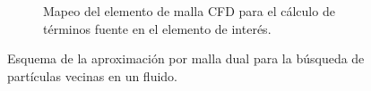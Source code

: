 \begin{figure}[h!]
\begin{subfigure}[b]{0.3\textwidth}
\begin{adjustbox}{max width = \textwidth}
		\end{adjustbox}
	\caption{Mapeo del elemento de malla CFD para el c\'alculo de t\'erminos fuente en el elemento de inter\'es.}
	\end{subfigure}
	\caption{Esquema de la aproximaci\'on por malla dual para la b\'usqueda de part\'iculas vecinas en un fluido.}
	\label{particle}
\end{figure}